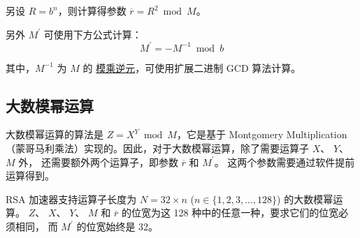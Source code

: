 \documentclass[main\_\_CN.tex]{subfiles}
\begin{document}
另设 \begin{math}R = b^{n}\end{math}，则计算得参数 \begin{math}\overline{r} = R^{2} \bmod M\end{math}。

另外 \begin{math}M^{\prime}\end{math} 可使用下方公式计算：
\[
        M^{\prime} = - M^{-1} \bmod b
\]

其中，$M^{-1}$ 为 $M$ 的 \href{https://zh.wikipedia.org/wiki/\%E6\%A8\%A1\%E5\%8F\%8D\%E5\%85\%83\%E7\%B4\%A0}{模乘逆元}，可使用扩展二进制 GCD 算法计算。

\subsection{大数模幂运算} \label{sec:rsa-large-modular-Exponentiation}

大数模幂运算的算法是 \begin{math}Z = X^{Y} \bmod M\end{math}，它是基于 Montgomery Multiplication（蒙哥马利乘法）实现的。因此，对于大数模幂运算，除了需要运算子
\begin{math}X\end{math}、
\begin{math}Y\end{math}、
\begin{math}M\end{math} 外，
还需要额外两个运算子，即参数
\begin{math}\overline{r}\end{math} 和
\begin{math}M^{\prime}\end{math}。
这两个参数需要通过软件提前运算得到。

RSA 加速器支持运算子长度为
\begin{math}N = 32 \times n\end{math} (\begin{math}n \in \{ 1,2,3, \dots, 128\} \end{math}) 的大数模幂运算。
\begin{math}Z\end{math}、
\begin{math}X\end{math}、
\begin{math}Y\end{math}、
\begin{math}M\end{math} 和
\begin{math}\overline{r}\end{math}
的位宽为这 128 种中的任意一种，要求它们的位宽必须相同，
而 \begin{math}M^{\prime}\end{math} 的位宽始终是 32。
\end{document}
